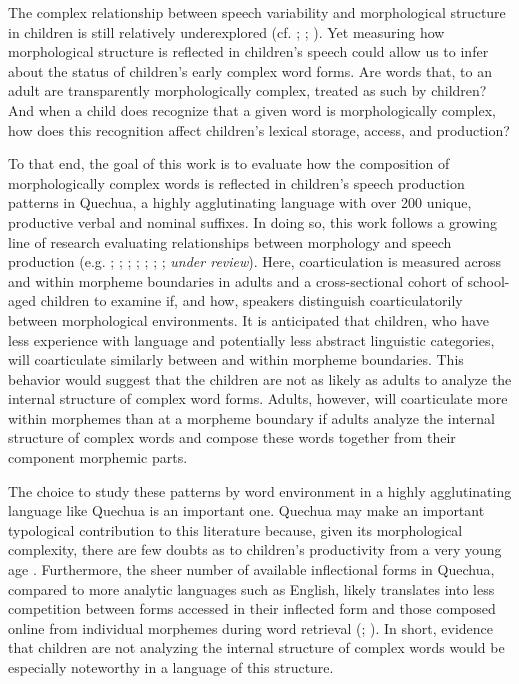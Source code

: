 \documentclass[a4paper,man,floatsintext,natbib,donotrepeattitle, apacite]{apa6}
\begin{document}
The complex relationship between speech variability and morphological structure in children is still relatively underexplored (cf. \citealt{redfordGrammaticalWordProduction2018}; \citealt{songEffectsCoarticulationMorphological2013}; \citealt{songDurationalCuesFricative2013}). Yet measuring how morphological structure is reflected in children's speech could allow us to infer about the status of children's early complex word forms. Are words that, to an adult are transparently morphologically complex, treated as such by children? And when a child does recognize that a given word is morphologically complex, how does this recognition affect children's lexical storage, access, and production? 

To that end, the goal of this work is to evaluate how the composition of morphologically complex words is reflected in children's speech production patterns in Quechua, a highly agglutinating language with over 200 unique, productive verbal and nominal suffixes. In doing so, this work follows a growing line of research evaluating relationships between morphology and speech production (e.g. \citealt{choEffectsMorphemeBoundaries2001};  \citealt{hayCausesConsequencesWord2003}; \citealt{lee-kimMorphologicalEffectsDarkness2013}; 
\citealt{plagPhonologicalPhoneticVariability2014};  \citealt{songDurationalCuesFricative2013}; \citealt{songEffectsCoarticulationMorphological2013}; 
\citealt{strycharczukPhoneticDetailPhonetic2019};
\citeauthor{tomaschekHowAnticipatoryCoarticulation2019} \textit{under review}). Here, coarticulation is measured across and within morpheme boundaries in adults and a cross-sectional cohort of school-aged children to examine if, and how, speakers distinguish coarticulatorily between morphological environments. It is anticipated that children, who have less experience with language and potentially less abstract linguistic categories, will coarticulate similarly between and within morpheme boundaries. This behavior would suggest that the children are not as likely as adults to analyze the internal structure of complex word forms. Adults, however, will coarticulate more within morphemes than at a morpheme boundary if adults analyze the internal structure of complex words and compose these words together from their component morphemic parts. 

The choice to study these patterns by word environment in a highly agglutinating language like Quechua is an important one. Quechua may make an important typological contribution to this literature because, given its morphological complexity, there are few doubts as to children's productivity from a very young age \citep{courtneyLearningConstructVerbs2002}. Furthermore, the sheer number of available inflectional forms in Quechua, compared to more analytic languages such as English, likely translates into less competition between forms accessed in their inflected form and those composed online from individual morphemes during word retrieval (\citealt{hayCausesConsequencesWord2003}; \citealt{pinkerFutureTense2002}). In short, evidence that children are not analyzing the internal structure of complex words would be especially noteworthy in a language of this structure.  
\end{document}
